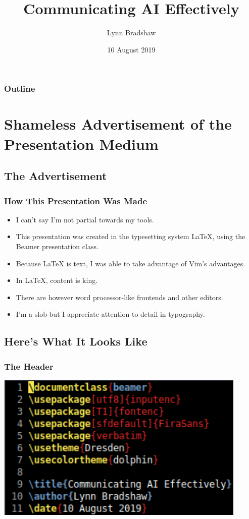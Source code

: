 \documentclass[10pt]{beamer}
\title{Communicating AI Effectively}
\author{Lynn Bradshaw}
\date{10 August 2019}
\begin{document}
  \begin{frame}
    \maketitle
  \end{frame}

  \begin{frame}
    \frametitle{Outline}
    \tableofcontents[pausesections]
  \end{frame}

  \section{Shameless Advertisement of the Presentation Medium}

  \subsection{The Advertisement}

  \begin{frame}
    \frametitle{How This Presentation Was Made}
    \begin{itemize}
      \item I can't say I'm not partial towards my tools.
      \pause
      \item This presentation was created in the typesetting system \LaTeX,
        using the Beamer presentation class.
      \pause
      \item Because \LaTeX{} is text, I was able to take advantage of Vim's
        advantages.
      \pause
      \item In \LaTeX, content is king.
      \item There are however word processor-like frontends and other editors.
      \pause
      \item I'm a slob but I appreciate attention to detail in typography.
    \end{itemize}
  \end{frame}

  \subsection{Here's What It Looks Like}

  \begin{frame}
    \frametitle{The Header}
    \begin{center}
      \includegraphics[width=0.9\textwidth]{latex-header.png}
    \end{center}
  \end{frame}
\end{document}
